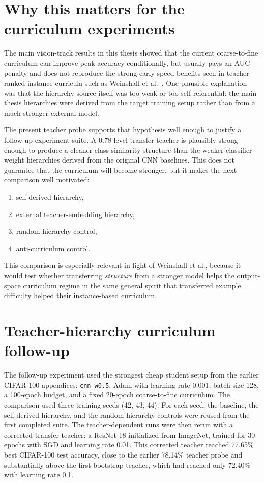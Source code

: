 \section{Why this matters for the curriculum experiments}

The main vision-track results in this thesis showed that the current
coarse-to-fine curriculum can improve peak accuracy conditionally, but usually
pays an AUC penalty and does not reproduce the strong early-speed benefits seen
in teacher-ranked instance curricula such as Weinshall et al.\ \cite{weinshall2018curriculum}.
One plausible explanation was that the
hierarchy source itself was too weak or too self-referential: the main thesis
hierarchies were derived from the target training setup rather than from a much
stronger external model.

The present teacher probe supports that hypothesis well enough to justify a
follow-up experiment suite. A 0.78-level transfer teacher is plausibly strong
enough to produce a cleaner class-similarity structure than the weaker
classifier-weight hierarchies derived from the original CNN baselines. This does
not guarantee that the curriculum will become stronger, but it makes the next
comparison well motivated:

\begin{enumerate}
    \item self-derived hierarchy,
    \item external teacher-embedding hierarchy,
    \item random hierarchy control,
    \item anti-curriculum control.
\end{enumerate}

This comparison is especially relevant in light of Weinshall et al., because it
would test whether transferring \emph{structure} from a stronger model helps the
output-space curriculum regime in the same general spirit that transferred
example difficulty helped their instance-based curriculum.

\section{Teacher-hierarchy curriculum follow-up}

The follow-up experiment used the strongest cheap student setup from the earlier
CIFAR-100 appendices: \texttt{cnn\_w0.5}, Adam with learning rate 0.001, batch
size 128, a 100-epoch budget, and a fixed 20-epoch coarse-to-fine curriculum.
The comparison used three training seeds (42, 43, 44). For each seed, the
baseline, the self-derived hierarchy, and the random hierarchy controls were
reused from the first completed suite. The teacher-dependent runs were then
rerun with a corrected transfer teacher: a ResNet-18 initialized from ImageNet,
trained for 30 epochs with SGD and learning rate 0.01. This corrected teacher
reached 77.65\% best CIFAR-100 test accuracy, close to the earlier 78.14\%
teacher probe and substantially above the first bootstrap teacher, which had
reached only 72.40\% with learning rate 0.1.

